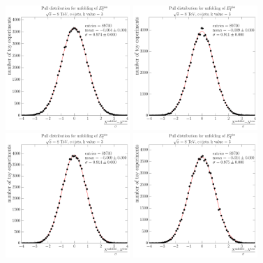 \begin{figure}[hbtp]
   	\centering
   	\vspace*{-0.8cm}
    \includegraphics[width=0.42\textwidth]{unfolding_performance/pull_from_files_bin_0_stats_89700} 
    \includegraphics[width=0.42\textwidth]{unfolding_performance/pull_from_files_bin_1_stats_89700}   \\
    \includegraphics[width=0.42\textwidth]{unfolding_performance/pull_from_files_bin_2_stats_89700} 
    \includegraphics[width=0.42\textwidth]{unfolding_performance/pull_from_files_bin_3_stats_89700}   \\

\end{figure}
